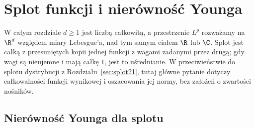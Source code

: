 \section{Splot funkcji i nierówność Younga}
\providecommand{\atlasref}[2]{#2}

W całym rozdziale $d\ge1$ jest liczbą całkowitą,
a przestrzenie $L^p$ rozważamy na $\R^d$ względem miary
Lebesgue'a, nad tym samym ciałem $\R$ lub $\C$.
Splot jest całką z przesuniętych kopii jednej funkcji
z wagami zadanymi przez drugą; gdy wagi są nieujemne
i mają całkę $1$, jest to uśrednianie. W przeciwieństwie do
splotu dystrybucji z Rozdziału~\ref{sec:splot21}, tutaj
główne pytanie dotyczy całkowalności funkcji wynikowej
i oszacowania jej normy, bez założeń o zwartości nośników.

\subsection{Nierówność Younga dla splotu}

